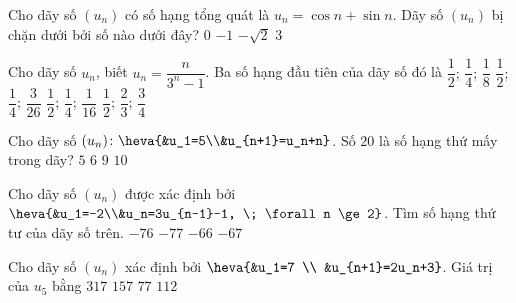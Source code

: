 \begin{ex}%
	Cho dãy số $(u_n)$ có số hạng tổng quát là $u_n =  \cos n + \sin n$. Dãy số $(u_n)$ bị chặn dưới bởi số nào dưới đây?
	\choice 
		 {$0$}
		{$-1$} 
		{\True  $-\sqrt{2}$}
		 {$3$}
\end{ex}

\begin{ex}%
	Cho  dãy số $u_n$, biết $u_n=\dfrac{n}{3^n-1}$. Ba số hạng đầu tiên của dãy số đó là
	 \choice
		{$\dfrac{1}{2}$; $\dfrac{1}{4}$; $\dfrac{1}{8}$} 
		{\True $\dfrac{1}{2}$;  $\dfrac{1}{4}$; $\dfrac{3}{26}$}
		{$\dfrac{1}{2}$; $\dfrac{1}{4}$;  $\dfrac{1}{16}$}
		{$\dfrac{1}{2}$; $\dfrac{2}{3}$;  $\dfrac{3}{4}$}
\end{ex}

\begin{ex}%
	Cho  dãy số $(u_n) \colon \heva{&u_1=5\\&u_{n+1}=u_n+n}$. Số $20$ là số hạng thứ mấy trong dãy?
	\choice 
		{$5$} 
		 {\True $6$}
		{$9$} 
		{$10$} 
\end{ex}

\begin{ex}%
	Cho dãy số  $(u_n)$ được xác định bởi $\heva{&u_1=-2\\&u_n=3u_{n-1}-1, \; \forall n \ge 2}$. Tìm số hạng thứ tư của dãy số trên.
	 \choice
		{$-76$} 
		 {$-77$}
		{$-66$} 
		{\True $-67$} 
\end{ex}

\begin{ex}%
	Cho dãy số $(u_n)$ xác  định bởi
	$\heva{&u_1=7  \\
	&u_{n+1}=2u_n+3}$. Giá trị  của $u_5$ bằng
	\choice 
		{$317$} 
		{\True $157$} 
		 {$77$}
		{$112$} 
\end{ex}

